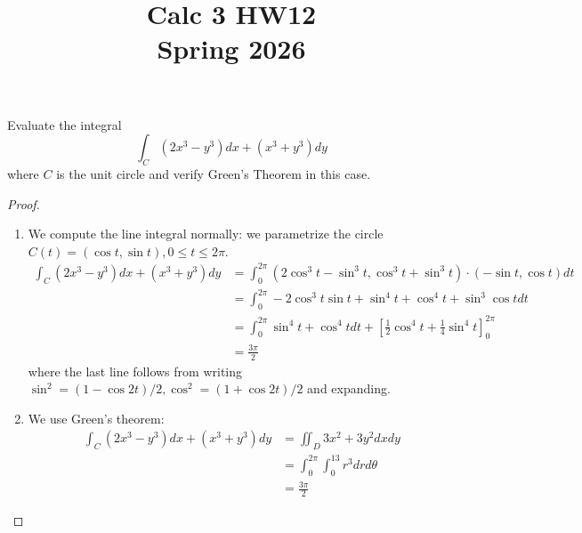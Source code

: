 \documentclass[openany]{book}
\title{Calc 3 HW12
\\ 
\vspace{0.4cm}
\large Spring 2026}
\begin{document}
\maketitle


\begin{prob}
    Evaluate the integral
    \[
    \int_C (2x^3 - y^3)dx + (x^3 + y^3)dy
    \]
    where $C$ is the unit circle and verify Green's Theorem in this case.
\end{prob}
\begin{proof}
    \begin{enumerate}
        \item We compute the line integral normally: we parametrize the circle $C(t)=(\cos t, \sin t), 0\leq t\leq 2\pi$.
        \begin{align*}
            \int_C(2x^3 - y^3)dx + (x^3 + y^3)dy&=\int_0^{2\pi}(2\cos^3t-\sin^3t, \cos^3t+\sin^3t)\cdot(-\sin t,\cos t)dt\\
            &=\int_0^{2\pi}-2\cos^3t\sin t+\sin^4t+\cos^4t+\sin^3\cos tdt\\
            &=\int_0^{2\pi}\sin^4t+\cos^4tdt+\left[\frac{1}{2}\cos^4t+\frac{1}{4}\sin^4t\right]_0^{2\pi}\\
            &=\frac{3\pi}{2}
        \end{align*}
        where the last line follows from writing $\sin^2=(1-\cos 2t)/2, \cos^2=(1+\cos 2t)/2$ and expanding.
        \item We use Green's theorem: 
        \begin{align*}
            \int_C(2x^3 - y^3)dx + (x^3 + y^3)dy&=\iint_D3x^2+3y^2dxdy\\
            &=\int_{0}^{2\pi}\int_0^13r^3drd\theta\\
            &=\frac{3\pi}{2}
        \end{align*}
    \end{enumerate}
\end{proof}
\end{document}
